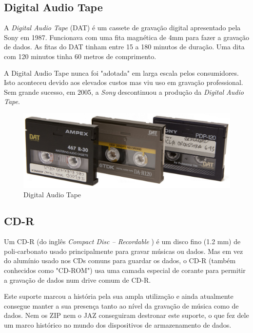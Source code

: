 \documentclass{report}
\begin{document}
		\subsection{Digital Audio Tape}
	A \textit{Digital Audio Tape} (DAT) é um cassete de gravação digital apresentado pela Sony em 1987.	
	Funcionava com uma fita magnética de 4mm para fazer a gravação de dados. As fitas do DAT tinham entre 15 a 180 minutos de duração. Uma dita com 120 minutos tinha 60 metros de comprimento.
	
	A Digital Audio Tape nunca foi "adotada" em larga escala pelos consumidores. Isto aconteceu devido aos elevados custos mas viu uso em gravação professional.
	Sem grande sucesso, em 2005, a \textit{Sony} descontinuou a produção da \textit{Digital Audio Tape}.
	 
	
	\begin{figure} [h]
		\centering
		\includegraphics[scale=0.3]{dat.jpg}
		\caption{Digital Audio Tape}
	\end{figure}

\newpage
	

		\subsection{CD-R}
	
	Um CD-R (do inglês \textit{Compact Disc – Recordable} ) é um disco fino (1.2 mm) de poli-carbonato usado principalmente para gravar músicas ou dados. Mas em vez do alumínio usado nos CDs comuns para guardar os dados, o CD-R (também conhecidos como "CD-ROM") usa uma camada especial de corante para permitir a gravação de dados num drive comum de CD-R.
\vspace{1mm}

	Este suporte marcou a história pela sua ampla utilização e ainda atualmente consegue manter a sua presença tanto ao nível da gravação de música como de dados. Nem os ZIP nem o JAZ conseguiram destronar este suporte, o que fez dele um marco histórico no mundo dos dispositivos de armazenamento de dados.
\vspace{1mm}
\end{document}

